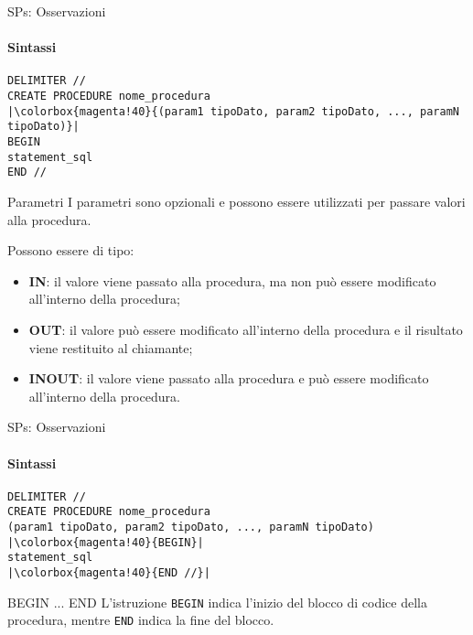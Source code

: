\begin{frame}[fragile]{SPs: Osservazioni}
\framesubtitle{Sintassi}
\vspace{-.8cm}
\begin{lstlisting}
DELIMITER //
CREATE PROCEDURE nome_procedura
|\colorbox{magenta!40}{(param1 tipoDato, param2 tipoDato, ..., paramN tipoDato)}|
BEGIN
statement_sql
END //
\end{lstlisting}
\begin{minipage}{\textwidth}
    \scriptsize \begin{block}{Parametri}
    I parametri sono opzionali e possono essere utilizzati per passare valori alla procedura.
    
    Possono essere di tipo:
    \begin{itemize}
        \item \textbf{IN}: il valore viene passato alla procedura, ma non pu\`o essere modificato all'interno della procedura;
        \item \textbf{OUT}: il valore pu\`o essere modificato all'interno della procedura e il risultato viene restituito al chiamante;
        \item \textbf{INOUT}: il valore viene passato alla procedura e pu\`o essere modificato all'interno della procedura.
    \end{itemize}
    \end{block}
    \end{minipage}
\end{frame}
%
\begin{frame}[fragile]{SPs: Osservazioni}
\framesubtitle{Sintassi}
\vspace{-.8cm}
\begin{lstlisting}
DELIMITER //
CREATE PROCEDURE nome_procedura
(param1 tipoDato, param2 tipoDato, ..., paramN tipoDato)
|\colorbox{magenta!40}{BEGIN}|
statement_sql
|\colorbox{magenta!40}{END //}|
\end{lstlisting}
\begin{minipage}{\textwidth}
    \begin{block}{BEGIN ... END}
    L'istruzione \texttt{BEGIN} indica l'inizio del blocco di codice della procedura, mentre \texttt{END} indica la fine del blocco.
    \end{block}
    \end{minipage}
\end{frame}
%
